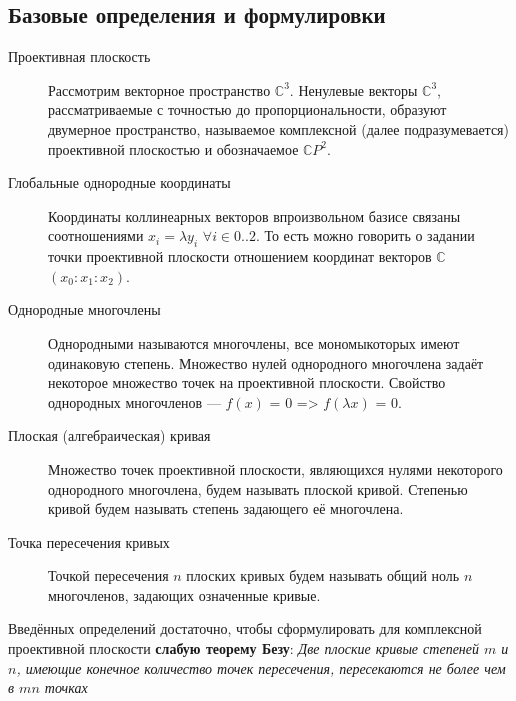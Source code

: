 \documentclass[a4paper, 12pt]{article}
\begin{document}
\subsection{Базовые определения и формулировки}
\begin{description}
\item[Проективная плоскость]
Рассмотрим векторное пространство $\mathbb{C}^3$. Ненулевые векторы $\mathbb{C}^3$, рассматриваемые с точностью до пропорциональности, образуют двумерное пространство, называемое комплексной (далее подразумевается) проективной плоскостью и обозначаемое $\mathbb{C}P^2$.
\item[Глобальные однородные координаты]
Координаты коллинеарных векторов в\newline произвольном базисе связаны соотношениями $x_i = \lambda y_i$ $\forall i \in {0..2}$. То есть можно говорить о задании точки проективной плоскости отношением координат векторов $\mathbb{C}$ $(x_0:x_1:x_2)$.
\end{description}
\begin{description}
\item[Однородные многочлены] Однородными называются многочлены, все мономы\newline которых имеют одинаковую степень. Множество нулей однородного многочлена задаёт некоторое множество точек на проективной плоскости. Свойство однородных многочленов --- $f(x)$ = $0$ => $f(\lambda x)$ = $0$.
\item[Плоская (алгебраическая) кривая]
Множество точек проективной плоскости\newline, являющихся нулями некоторого однородного многочлена, будем называть плоской кривой. Степенью кривой будем называть степень задающего её многочлена.
\item[Точка пересечения кривых]
Точкой пересечения $n$ плоских кривых будем называть общий ноль $n$ многочленов, задающих означенные кривые.
\end{description}
Введённых определений достаточно, чтобы сформулировать для комплексной проективной плоскости \textbf{слабую теорему Безу}:
\textit{Две плоские кривые степеней $m$ и $n$, имеющие конечное количество точек пересечения, пересекаются не более чем в $mn$ точках}
\end{document}
